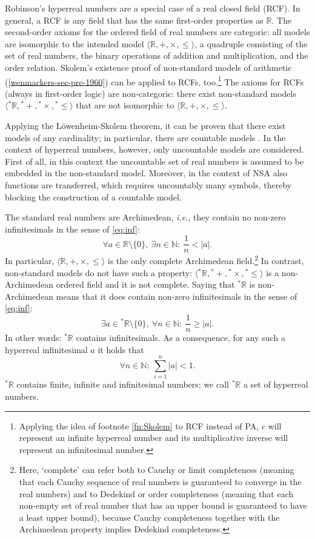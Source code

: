 Robinson's hyperreal numbers are a special case of a real closed field (RCF). In general, a RCF is any field that has the same first-order properties as $\mathbb{R}$.
The second-order axioms for the ordered field of real numbers are categoric: all models are isomorphic to the intended model $\langle \mathbb{R}, +, \times, \leq \rangle$, a quadruple consisting of the set of real numbers, the binary operations of addition and multiplication, and the order relation.
Skolem's existence proof of non-standard models of arithmetic (\autoref{wenmackers-sec-pre-1960}) can be applied to RCFs, too.\footnote{Applying the idea of footnote \ref{fn:Skolem} to RCF instead of PA, $c$ will represent an infinite hyperreal number and its multiplicative inverse will represent an infinitesimal number.}
The axioms for RCFs (always in first-order logic) are non-categoric: there exist non-standard models $\langle {^\ast\mathbb{R}}, {^\ast +}, {^\ast \times}, {^\ast \! \leq} \rangle$ that are not isomorphic to $\langle \mathbb{R}, +, \times, \leq \rangle$.

Applying the L\"{o}wenheim-Skolem theorem, it can be proven that there exist models of any cardinality; in particular, there are countable models \citep[\textit{cf.}\ the ``paradox'' of][]{Skolem:1922}.
In the context of hyperreal numbers, however, only uncountable models are considered. First of all, in this context the uncountable set of real numbers is assumed to be embedded in the non-standard model. Moreover, in the context of NSA also functions are transferred, which requires uncountably many symbols, thereby blocking the construction of a countable model.

The standard real numbers are Archimedean, \textit{i.e.}, they contain no non-zero infinitesimals in the sense of \autoref{eq:inf}:
$$ \forall a \in \mathbb{R} \setminus \{0\}, \ \exists n \in \mathbb{N} : \ \frac{1}{n} < | a |. $$
In particular, $\langle \mathbb{R}, +, \times, \leq \rangle$ is the only complete Archimedean field.\footnote{Here, `complete' can refer both to Cauchy or limit completeness (meaning that each Cauchy sequence of real numbers is guaranteed to converge in the real numbers) and to Dedekind or order completeness (meaning that each non-empty set of real number that has an upper bound is guaranteed to have a least upper bound), because Cauchy completeness together with the Archimedean property implies Dedekind completeness.}
In contrast, non-standard models do not have such a property: $\langle {^\ast\mathbb{R}}, {^\ast +}, {^\ast \times}, {^\ast \leq} \rangle$ is a non-Archimedean ordered field and it is not complete.
Saying that ${^\ast\mathbb{R}}$ is non-Archimedean means that it does contain non-zero infinitesimals in the sense of \autoref{eq:inf}:
$$
	\exists a \in {^\ast\mathbb{R}} \setminus \{0\}, \ \forall n \in \mathbb{N} : \ \frac{1}{n} \geq | a |.
$$
In other words: ${^\ast\mathbb{R}}$ contains infinitesimals. As a consequence, for any such a hyperreal infinitesimal $a$ it holds that
$$
	\forall n \in \mathbb{N} : \ \sum_{i=1}^{n} | a | < 1.
$$
${^\ast\mathbb{R}}$ contains finite, infinite and infinitesimal numbers; we call ${^\ast\mathbb{R}}$ a set of hyperreal numbers.

